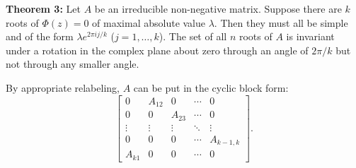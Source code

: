 \textbf{Theorem 3:} Let $A$ be an irreducible non-negative matrix. Suppose there are $k$ roots of $\Phi(z) = 0$ of maximal absolute value $\lambda$. Then they must all be simple and of the form $\lambda e^{2\pi i j/k}$ ($j = 1, \ldots, k$). The set of all $n$ roots of $A$ is invariant under a rotation in the complex plane about zero through an angle of $2\pi/k$ but not through any smaller angle.

By appropriate relabeling, $A$ can be put in the cyclic block form:
$$\begin{bmatrix}
0 & A_{12} & 0 & \cdots & 0 \\
0 & 0 & A_{23} & \cdots & 0 \\
\vdots & \vdots & \vdots & \ddots & \vdots \\
0 & 0 & 0 & \cdots & A_{k-1,k} \\
A_{k1} & 0 & 0 & \cdots & 0
\end{bmatrix}.$$
